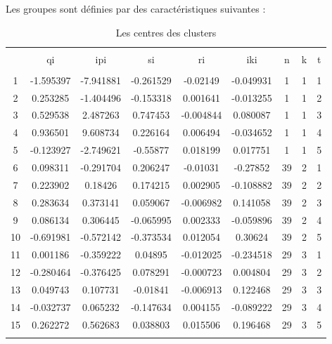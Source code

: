 \documentclass[11pt,]{article}
\begin{document}
Les groupes sont définies par des caractéristiques suivantes :

\FloatBarrier

\begin{table}[!htbp] \centering 
  \caption{Les centres des clusters} 
  \label{} 
\begin{tabular}{@{\extracolsep{5pt}} ccccccccc} 
\\[-1.8ex]\hline 
\hline \\[-1.8ex] 
 & qi & ipi & si & ri & iki & n & k & t \\ 
\hline \\[-1.8ex] 
1 & -1.595397 & -7.941881 & -0.261529 & -0.02149 & -0.049931 & 1 & 1 & 1 \\ 
2 & 0.253285 & -1.404496 & -0.153318 & 0.001641 & -0.013255 & 1 & 1 & 2 \\ 
3 & 0.529538 & 2.487263 & 0.747453 & -0.004844 & 0.080087 & 1 & 1 & 3 \\ 
4 & 0.936501 & 9.608734 & 0.226164 & 0.006494 & -0.034652 & 1 & 1 & 4 \\ 
5 & -0.123927 & -2.749621 & -0.55877 & 0.018199 & 0.017751 & 1 & 1 & 5 \\ 
6 & 0.098311 & -0.291704 & 0.206247 & -0.01031 & -0.27852 & 39 & 2 & 1 \\ 
7 & 0.223902 & 0.18426 & 0.174215 & 0.002905 & -0.108882 & 39 & 2 & 2 \\ 
8 & 0.283634 & 0.373141 & 0.059067 & -0.006982 & 0.141058 & 39 & 2 & 3 \\ 
9 & 0.086134 & 0.306445 & -0.065995 & 0.002333 & -0.059896 & 39 & 2 & 4 \\ 
10 & -0.691981 & -0.572142 & -0.373534 & 0.012054 & 0.30624 & 39 & 2 & 5 \\ 
11 & 0.001186 & -0.359222 & 0.04895 & -0.012025 & -0.234518 & 29 & 3 & 1 \\ 
12 & -0.280464 & -0.376425 & 0.078291 & -0.000723 & 0.004804 & 29 & 3 & 2 \\ 
13 & 0.049743 & 0.107731 & -0.01841 & -0.006913 & 0.122468 & 29 & 3 & 3 \\ 
14 & -0.032737 & 0.065232 & -0.147634 & 0.004155 & -0.089222 & 29 & 3 & 4 \\ 
15 & 0.262272 & 0.562683 & 0.038803 & 0.015506 & 0.196468 & 29 & 3 & 5 \\ 
\hline \\[-1.8ex] 
\end{tabular} 
\end{table}

\FloatBarrier
\end{document}
